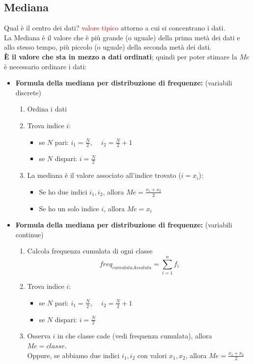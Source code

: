 \documentclass{article}  %
\theoremstyle{definition}
\begin{document}
\subsection{Mediana}
Qual è il centro dei dati? \textcolor{red}{valore tipico} attorno a cui si concentrano i dati. \\
La Mediana è il valore che è più grande (o uguale) della prima metà dei dati e allo stesso tempo, più piccolo (o uguale) della seconda metà dei dati. \\
\textbf{È il valore che sta in mezzo a dati ordinati}; quindi per poter stimare la $Me$ è necessario ordinare i dati:
\begin{itemize}
	\item \textbf{Formula della mediana per distribuzione di frequenze:} (variabili discrete)
	      \begin{enumerate}
		      \item Ordina i dati
		      \item Trova indice $i$:
		            \begin{itemize}
			            \item se $N$ pari: $i_1=\frac{N}{2}$, $\quad i_2=\frac{N}{2}+1$
			            \item se $N$ dispari: $i=\frac{N}{2}$
		            \end{itemize}
		      \item La mediana è il valore associato all'indice trovato ($i=x_i$):
		            \begin{itemize}
			            \item Se ho due indici $i_1, i_2$, allora $Me=\frac{x_1+x_2}{2}$
			            \item Se ho un solo indice $i$, allora $Me=x_i$
		            \end{itemize}
	      \end{enumerate}
	\item \textbf{Formula della mediana per distribuzione di frequenze:} (variabili continue)
	      \begin{enumerate}
		      \item Calcola frequenza cumulata di ogni classe
		            \[ freq_{cumulataAssoluta}= \sum_{i=1}^{n} f_i \]
		      \item Trova indice $i$:
		            \begin{itemize}
			            \item se $N$ pari: $i_1=\frac{N}{2}$, $\quad i_2=\frac{N}{2}+1$
			            \item se $N$ dispari: $i=\frac{N}{2}$
		            \end{itemize}
		      \item Osserva $i$ in che classe cade (vedi frequenza cumulata), allora $Me=classe$. \\
		            Oppure, se abbiamo due indici $i_1,i_2$ con valori $x_1, x_2$, allora $Me=\frac{x_1+x_2}{2}$
	      \end{enumerate}
\end{itemize}
\end{document}
